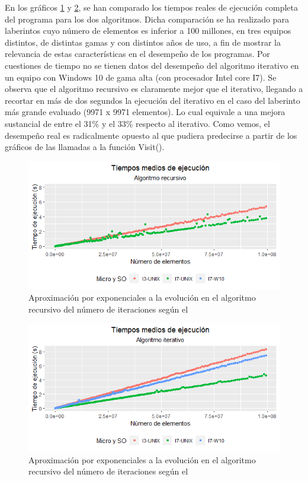 \documentclass[12pt,a4paper]{article}
\begin{document}
En los gráficos \ref{grafico4} y \ref{grafico5}, se han comparado los tiempos reales de ejecución completa del programa para los dos algoritmos. Dicha comparación se ha realizado para laberintos cuyo número de elementos es inferior a 100 millones, en tres equipos distintos, de distintas gamas y con distintos años de uso, a fin de mostrar la relevancia de estas características en el desempeño de los programas. Por cuestiones de tiempo no se tienen datos del desempeño del algoritmo iterativo en un equipo con Windows 10 de gama alta (con procesador Intel core I7). Se observa que el algoritmo recursivo es claramente mejor que el iterativo, llegando a recortar en más de dos segundos la ejecución del iterativo en el caso del laberinto más grande evaluado (9971 x 9971 elementos). Lo cual equivale a una mejora sustancial de entre el 31\% y el 33\% respecto al iterativo. Como vemos, el desempeño real es radicalmente opuesto al que pudiera predecirse a partir de los gráficos de las llamadas a la función Visit(). 

\begin{figure}[h]
	\centering
	\includegraphics[scale=0.9]{fotos/Tiempos_recursivo.png}
	\caption{Aproximación por exponenciales a la evolución en el algoritmo recursivo del número de iteraciones según el }
	\label{grafico4}
\end{figure}
\vspace{0.2cm}

\begin{figure}[h]
	\centering
	\includegraphics[scale=0.9]{fotos/Tiempos_Iterativo.png}
	\caption{Aproximación por exponenciales a la evolución en el algoritmo recursivo del número de iteraciones según el }
	\label{grafico5}
\end{figure}
\vspace{0.2cm}
\end{document}
